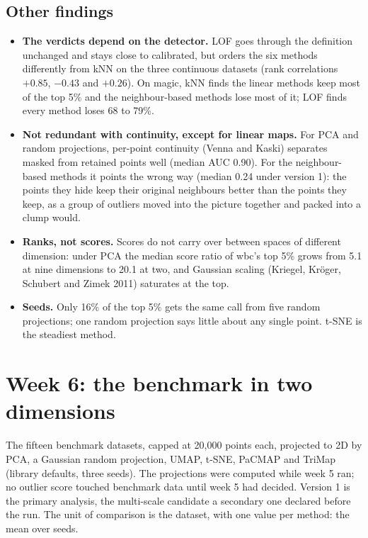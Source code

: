\subsection*{Other findings}

\begin{itemize}
  \item \textbf{The verdicts depend on the detector.} LOF goes through the
    definition unchanged and stays close to calibrated, but orders the six
    methods differently from kNN on the three continuous datasets (rank
    correlations $+0.85$, $-0.43$ and $+0.26$). On magic, kNN finds the
    linear methods keep most of the top 5\% and the neighbour-based methods
    lose most of it; LOF finds every method loses 68 to 79\%.
  \item \textbf{Not redundant with continuity, except for linear maps.}
    For PCA and random projections, per-point continuity (Venna and Kaski)
    separates masked from retained points well (median AUC 0.90). For the
    neighbour-based methods it points the wrong way (median 0.24 under
    version 1): the points they hide keep their original neighbours better
    than the points they keep, as a group of outliers moved into the
    picture together and packed into a clump would.
  \item \textbf{Ranks, not scores.} Scores do not carry over between spaces
    of different dimension: under PCA the median score ratio of wbc's top
    5\% grows from 5.1 at nine dimensions to 20.1 at two, and Gaussian
    scaling (Kriegel, Kr\"oger, Schubert and Zimek 2011) saturates at the top.
  \item \textbf{Seeds.} Only 16\% of the top 5\% gets the same call from five
    random projections; one random projection says little about any single
    point. t-SNE is the steadiest method.
\end{itemize}

\section*{Week 6: the benchmark in two dimensions}

The fifteen benchmark datasets, capped at 20,000 points each, projected to
2D by PCA, a Gaussian random projection, UMAP, t-SNE, PaCMAP and TriMap
(library defaults, three seeds). The projections were computed while week 5
ran; no outlier score touched benchmark data until week 5 had decided.
Version 1 is the primary analysis, the multi-scale candidate a secondary one
declared before the run. The unit of comparison is the dataset, with one
value per method: the mean over seeds.

